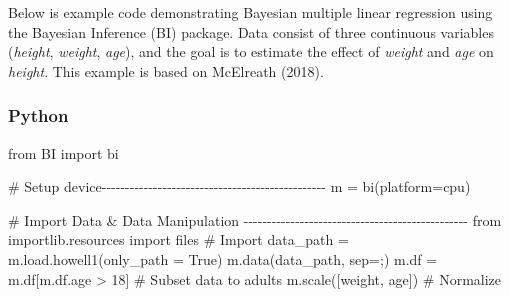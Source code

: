 \documentclass[
  letterpaper,
  DIV=11,
  numbers=noendperiod]{scrartcl}
\newenvironment{Shaded}{\begin{snugshade}}{\end{snugshade}}
\newcommand{\CommentTok}[1]{\textcolor[rgb]{0.37,0.37,0.37}{#1}}
\newcommand{\DecValTok}[1]{\textcolor[rgb]{0.68,0.00,0.00}{#1}}
\newcommand{\ImportTok}[1]{\textcolor[rgb]{0.00,0.46,0.62}{#1}}
\newcommand{\NormalTok}[1]{\textcolor[rgb]{0.00,0.23,0.31}{#1}}
\newcommand{\OperatorTok}[1]{\textcolor[rgb]{0.37,0.37,0.37}{#1}}
\newcommand{\StringTok}[1]{\textcolor[rgb]{0.13,0.47,0.30}{#1}}
\newcommand{\VariableTok}[1]{\textcolor[rgb]{0.07,0.07,0.07}{#1}}
\begin{document}
Below is example code demonstrating Bayesian multiple linear regression
using the Bayesian Inference (BI) package. Data consist of three
continuous variables (\emph{height}, \emph{weight}, \emph{age}), and the
goal is to estimate the effect of \emph{weight} and \emph{age} on
\emph{height}. This example is based on McElreath (2018).

\subsubsection{Python}

\begin{Shaded}
\begin{Highlighting}[]
\ImportTok{from}\NormalTok{ BI }\ImportTok{import}\NormalTok{ bi}

\CommentTok{\# Setup device{-}{-}{-}{-}{-}{-}{-}{-}{-}{-}{-}{-}{-}{-}{-}{-}{-}{-}{-}{-}{-}{-}{-}{-}{-}{-}{-}{-}{-}{-}{-}{-}{-}{-}{-}{-}{-}{-}{-}{-}{-}{-}{-}{-}{-}{-}{-}{-}}
\NormalTok{m }\OperatorTok{=}\NormalTok{ bi(platform}\OperatorTok{=}\StringTok{\textquotesingle{}cpu\textquotesingle{}}\NormalTok{)}

\CommentTok{\# Import Data \& Data Manipulation {-}{-}{-}{-}{-}{-}{-}{-}{-}{-}{-}{-}{-}{-}{-}{-}{-}{-}{-}{-}{-}{-}{-}{-}{-}{-}{-}{-}{-}{-}{-}{-}{-}{-}{-}{-}{-}{-}{-}{-}{-}{-}{-}{-}{-}{-}{-}{-}}
\ImportTok{from}\NormalTok{ importlib.resources }\ImportTok{import}\NormalTok{ files}
\CommentTok{\# Import}
\NormalTok{data\_path }\OperatorTok{=}\NormalTok{ m.load.howell1(only\_path }\OperatorTok{=} \VariableTok{True}\NormalTok{)}
\NormalTok{m.data(data\_path, sep}\OperatorTok{=}\StringTok{\textquotesingle{};\textquotesingle{}}\NormalTok{) }
\NormalTok{m.df }\OperatorTok{=}\NormalTok{ m.df[m.df.age }\OperatorTok{\textgreater{}} \DecValTok{18}\NormalTok{] }\CommentTok{\# Subset data to adults}
\NormalTok{m.scale([}\StringTok{\textquotesingle{}weight\textquotesingle{}}\NormalTok{, }\StringTok{\textquotesingle{}age\textquotesingle{}}\NormalTok{]) }\CommentTok{\# Normalize}


\end{Highlighting}
\end{Shaded}
\end{document}
